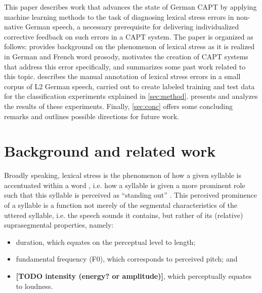 \documentclass[a4paper]{article}
\newcommand{\TODO}[1]{{\color{red}\textbf{[TODO #1]}}}
\begin{document}
  This paper describes work that advances the state of German CAPT by applying machine learning methods to the task of diagnosing lexical stress errors in non-native German speech, a necessary prerequisite for delivering individualized corrective feedback on such errors in a CAPT system. The paper is organized as follows:  provides background on the phenomenon of lexical stress as it is realized in German and French word prosody, motivates the creation of CAPT systems that address this error specifically, and summarizes some past work related to this topic.  describes the manual annotation of lexical stress errors in a small corpus of L2 German speech, carried out to create labeled training and test data for the classification experiments explained in \cref{sec:method}.  presents and analyzes the results of these experiments. Finally, \cref{sec:conc} offers some concluding remarks and outlines possible directions for future work.



	\section{Background and related work}
	\label{sec:bkgd}
	

Broadly speaking, lexical stress is the phenomenon of how a given syllable is accentuated within a word \cite{Cutler2005}, i.e. how a syllable is given a more prominent role such that this syllable is perceived as ``standing out'' \cite{Dogil1999}. This perceived prominence of a syllable is a function not merely of the segmental characteristics of the uttered syllable, i.e. the speech sounds it contains, but rather of its (relative) suprasegmental properties, namely:
\begin{itemize}[topsep=.5em,noitemsep]
\item duration, which equates on the perceptual level to length;
\item fundamental frequency (F0), which corresponds to perceived pitch; and 
\item \TODO{intensity (\textbf{energy?} or amplitude)}, which perceptually equates to loudness.
\end{itemize}
\end{document}
